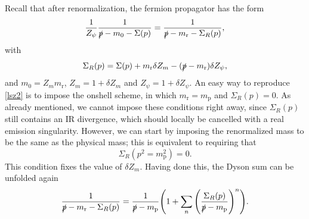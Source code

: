 \documentclass[11pt]{article}
\begin{document}
Recall that after renormalization, the fermion propagator has the form   
\begin{equation}
\frac{1}{Z_\psi}\frac{1}{\slashed p -m_0-\Sigma(p)}=\frac{1}{\slashed p -m_\text{r}-\Sigma_R(p)},
\end{equation}
with
\begin{equation}
\label{eq:definingRenormSigma}
\Sigma_R(p)=\Sigma(p)+m_\text{r} \delta Z_m - (\slashed p - m_\text{r})\delta Z_\psi,
\end{equation}
and $m_0=Z_m m_\text{r}$, $Z_m=1+\delta Z_m$ and $Z_\psi=1+\delta Z_\psi$. An easy way to reproduce \eqref{lsz2} is to impose the onshell scheme, in which $m_\text{r}=m_\text{p}$ and $\Sigma_R(p)=0$. As already mentioned, we cannot impose these conditions right away, since $\Sigma_R(p)$ still contains an IR divergence, which should locally be cancelled with a real emission singularity. However, we can start by imposing the renormalized mass to be the same as the physical mass; this is equivalent to requiring that
\begin{equation}\label{onshell1}
\Sigma_R(p^2=m_\text{p}^2)=0.
\end{equation}
This condition fixes the value of $\delta Z_m$. Having done this, the Dyson sum can be unfolded again
\begin{equation}
\frac{1}{\slashed p -m_\text{r}-\Sigma_R(p)}=\frac{1}{\slashed p -m_\text{p}}\Bigg(1+\sum_n \Bigg(\frac{\Sigma_R(p)}{\slashed p -m_\text{p}}\Bigg)^n\Bigg).
\end{equation}
\end{document}
